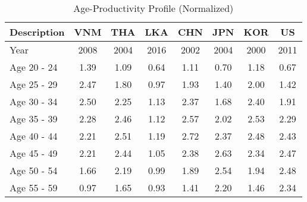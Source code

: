 \documentclass[preprint,12pt,authoryear]{elsarticle}
\begin{document}
	\begin{table}[H]
		\begin{threeparttable}
			\caption{Age-Productivity Profile (Normalized)}
			\label{table:age-prod-profile}
			\centering
			\begin{tabular}{ l c c c c c c c  }
				\toprule
				Description                                                   & VNM            & THA            & LKA              & CHN            & JPN            & KOR            & US             \\
				\midrule
				Year                                                          & 2008           & 2004           & 2016             & 2002           & 2004           & 2000           & 2011           \\
				\midrule
				Age 20 - 24                                                   & 1.39           & 1.09           & 0.64             & 1.11           & 0.70           & 1.18           & 0.67           \\
				Age 25 - 29                                                   & 2.47           & 1.80           & 0.97             & 1.93           & 1.40           & 2.00           & 1.42           \\
				Age 30 - 34                                                   & 2.50           & 2.25           & 1.13             & 2.37           & 1.68           & 2.40           & 1.91           \\
				Age 35 - 39                                                   & 2.28           & 2.46           & 1.12             & 2.57           & 2.02           & 2.53           & 2.29           \\
				Age 40 - 44                                                   & 2.21           & 2.51           & 1.19             & 2.72           & 2.37           & 2.48           & 2.43           \\
				Age 45 - 49                                                   & 2.21           & 2.44           & 1.05             & 2.38           & 2.63           & 2.34           & 2.47           \\
				Age 50 - 54                                                   & 1.66           & 2.19           & 0.99             & 1.89           & 2.54           & 1.94           & 2.48           \\
				Age 55 - 59                                                   & 0.97           & 1.65           & 0.93             & 1.41           & 2.20           & 1.46           & 2.34           \\

\end{tabular}
\end{threeparttable}
\end{table}
\end{document}

